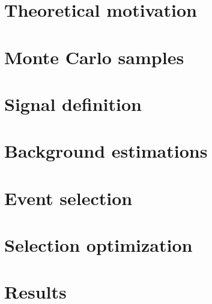 \section{Theoretical motivation}\label{sswwupgrade:theory}


\section{Monte Carlo samples}\label{sswwupgrade:mc}


\section{Signal definition}\label{sswwupgrade:signal}


\section{Background estimations}\label{sswwupgrade:background}


\section{Event selection}\label{sswwupgrade:event_selection}


\section{Selection optimization}\label{sswwupgrade:optimization}


\section{Results}\label{sswwupgrade:results}

